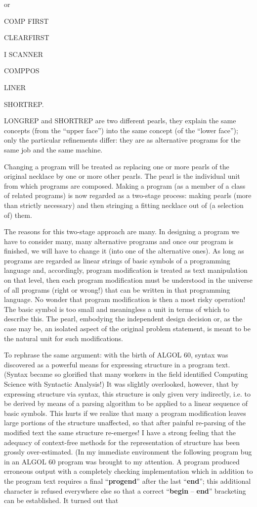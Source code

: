 \noindent
or

COMP FIRST

CLEARFIRST

I SCANNER

COMPPOS

LINER

SHORTREP.

LONGREP and SHORTREP are two different pearls, they explain the same concepts (from the ``upper face'') into the same concept (of the ``lower face''); only the particular refinements differ: they are as alternative programs for the same job and the same machine.

Changing a program will be treated as replacing one or more pearls of the original necklace by one or more other pearls. The pearl is the individual unit from which programs are composed. Making a program (as a member of a class of related programs) is now regarded as a two-stage process: making pearls (more than strictly necessary) and then stringing a fitting necklace out of (a selection of) them.

The reasons for this two-stage approach are many. In designing a program we have to consider many, many alternative programs and once our program is finished, we will have to change it (into one of the alternative ones). As long as programs are regarded as linear strings of basic symbols of a programming language and, accordingly, program modification is treated as text manipulation on that level, then each program modification must be understood in the universe of all programs (right or wrong!) that can be written in that programming language. No wonder that program modification is then a most risky operation! The basic symbol is too small and meaningless a unit in terms of which to describe this. The pearl, embodying the independent design decision or, as the case may be, an isolated aspect of the original problem statement, is meant to be the natural unit for such modifications.

To rephrase the same argument: with the birth of ALGOL 60, syntax was discovered as a powerful means for expressing structure in a program text. (Syntax became so glorified that many workers in the field identified Computing Science with Syntactic Analysis!) It was slightly overlooked, however, that by expressing structure via syntax, this structure is only given very indirectly, i.e. to be derived by means of a parsing algorithm to be applied to a linear sequence of basic symbols. This hurts if we realize that many a program modification leaves large portions of the structure unaffected, so that after painful re-parsing of the modified text the same structure re-emerges! I have a strong feeling that the adequacy of context-free methods for the representation of structure has been grossly over-estimated. (In my immediate environment the following program bug in an ALGOL 60 program was brought to my attention. A program produced erroneous output with a completely checking implementation which in addition to the program text requires a final ``\textbf{progend}'' after the last ``\textbf{end}''; this additional character is refused everywhere else so that a correct ``\textbf{begin} -- \textbf{end}'' bracketing can be established. It turned out that

